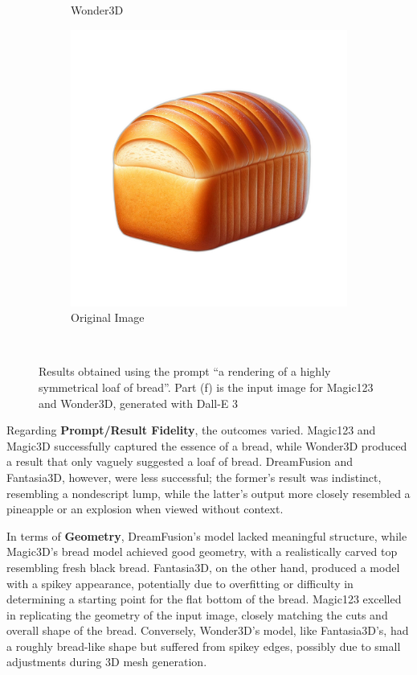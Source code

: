 \begin{figure}[ht]
\begin{subfigure}[b]{0.23\textwidth}
        \caption{Wonder3D}
        \vspace{0.1cm}
    \end{subfigure}
    \begin{subfigure}[b]{0.23\textwidth}
        \centering
        \includegraphics[width=\textwidth]{figures/input/bread.png}
        \caption{Original Image}
        \vspace{0.1cm}
    \end{subfigure}
    \caption{Results obtained using the prompt ``a rendering of a highly symmetrical loaf of bread''. Part (f) is the input image for Magic123 and Wonder3D, generated with Dall-E 3}~\label{fig:resultBread}
\end{figure}

Regarding \textbf{Prompt/Result Fidelity}, the outcomes varied. Magic123 and Magic3D successfully captured the essence of a bread, while Wonder3D produced a result that only vaguely suggested a loaf of bread. DreamFusion and Fantasia3D, however, were less successful; the former's result was indistinct, resembling a nondescript lump, while the latter's output more closely resembled a pineapple or an explosion when viewed without context.

In terms of \textbf{Geometry}, DreamFusion's model lacked meaningful structure, while Magic3D's bread model achieved good geometry, with a realistically carved top resembling fresh black bread. Fantasia3D, on the other hand, produced a model with a spikey appearance, potentially due to overfitting or difficulty in determining a starting point for the flat bottom of the bread. Magic123 excelled in replicating the geometry of the input image, closely matching the cuts and overall shape of the bread. Conversely, Wonder3D's model, like Fantasia3D's, had a roughly bread-like shape but suffered from spikey edges, possibly due to small adjustments during 3D mesh generation.

